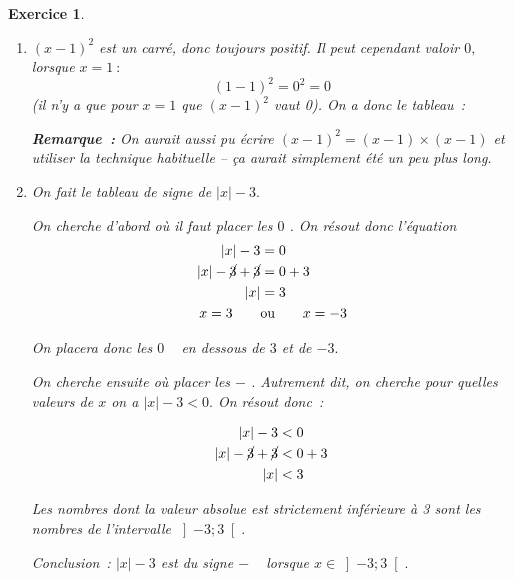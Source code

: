 \documentclass[10pt]{article}
\newtheorem{exo}{Exercice}
\begin{document}
\begin{exo}
\begin{enumerate}

\item $(x-1)^2$ est un carré, donc toujours positif. Il peut cependant valoir $0,$ lorsque $x=1~:$
\[(1-1)^2=0^2=0\]
(il n'y a que pour $x=1$ que $(x-1)^2$ vaut 0). On a donc le tableau~:

\medskip

\begin{center}
\end{center}

\medskip

\textbf{Remarque~:} On aurait aussi pu écrire $(x-1)^2=(x-1)\times (x-1)$ et utiliser la technique habituelle -- ça aurait simplement été un peu plus long.


\item On fait le tableau de signe de $|x|-3.$

\medskip

On cherche d'abord où il faut placer les \og $0$ \fg. On résout donc l'équation
\begin{align*}|x|-3&=0\\
|x|-\cancel{3}+\cancel{3}&=0+3\\
|x|&=3\\
x=3\qquad&\text{ou}\qquad x=-3
\end{align*}

On placera donc les \og $0$ \fg~{} en dessous de $3$ et de $-3.$

\medskip

On cherche ensuite où placer les \og $-$ \fg. Autrement dit, on cherche pour quelles valeurs de $x$ on a $|x|-3<0.$ On résout donc~:

\begin{align*}|x|-3&<0\\
|x|-\cancel{3}+\cancel{3}&<0+3\\
|x|&<3
\end{align*}

Les nombres dont la valeur absolue est strictement inférieure à 3 sont les nombres de l'intervalle $\left]-3;3\right[.$

Conclusion~: $|x|-3$ est du signe \og $-$ \fg~{} lorsque $x\in \left]-3;3\right[.$


\end{enumerate}
\end{exo}
\end{document}
